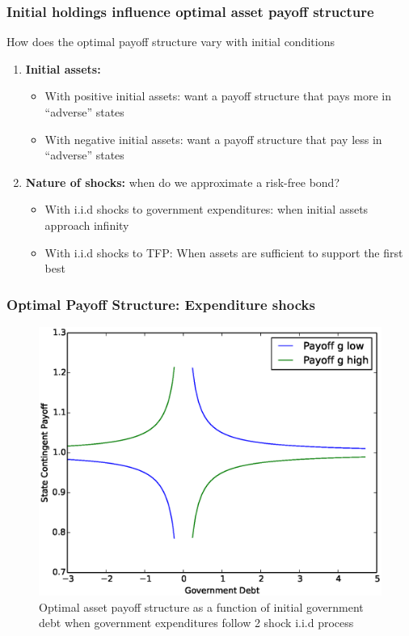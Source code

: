 \documentclass{beamer}
\begin{document}
		
\begin{frame}		
   \frametitle{Initial holdings influence optimal asset payoff structure}
How does the optimal payoff structure vary with initial conditions
\begin{enumerate}
\item \textbf{Initial assets: }
\begin{itemize}

 \item With positive initial assets: want a payoff structure that pays more in ``adverse'' states
 \item With negative initial assets: want a payoff structure that pay less in ``adverse'' states
\end{itemize}

 \item \textbf{Nature of shocks: } when do we approximate a risk-free bond?
 \begin{itemize}
  \item With i.i.d shocks to government expenditures: when initial assets approach  infinity
  \item With i.i.d  shocks to  TFP: When assets are sufficient to support the first best
 \end{itemize}

\end{enumerate}



  \end{frame}


  \begin{frame}
   \frametitle{Optimal Payoff Structure: Expenditure shocks}
	\begin{figure}
		\begin{center}
		\includegraphics[scale=.4]{Images/p_graph.eps}
		\caption{Optimal asset payoff structure as a function of initial government debt when government expenditures follow 2 shock i.i.d process}
	\end{center}	
	\end{figure}

  \end{frame}
\end{document}
